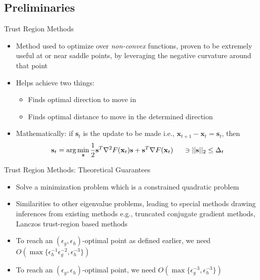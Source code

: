 \documentclass[10pt]{beamer}
\newcommand{\h}{\nabla^{2}}
\newcommand{\g}{\nabla}
\newcommand{\xbold}{\mathbf{x}}
\newcommand{\sbold}{\mathbf{s}}
\begin{document}
\subsection{Preliminaries}
\begin{frame}{Trust Region Methods}
\begin{itemize}
\item<1->{Method used to optimize over \emph{non-convex} functions, proven to be extremely useful at or near saddle points, by leveraging the negative curvature around that point}
\item<2->{Helps achieve two things:
  \begin{itemize}
    \item<3->Finds optimal direction to move in
    \item<4->Finds optimal distance to move in the determined direction
  \end{itemize}
  }
\item<5->{Mathematically: if \(\sbold_{t}\) is the update to be made i.e., \(\xbold_{t+1} - \xbold_{t} = \sbold_{t}\), then
\begin{equation}
\label{TR}
\sbold_{t} = \text{arg}\min_{\sbold} \frac{1}{2}\sbold^{T} \h F(\xbold_{t}) \sbold + \sbold^{T} \g F(\xbold_{t}) \hspace{5mm}\ni ||\sbold||_{2} \leq \Delta_{t}
\end{equation} %
}
\end{itemize}
\end{frame}

\begin{frame}{Trust Region Methods: Theoretical Guarantees}
\begin{itemize}
\item<1->{Solve a minimization problem which is a constrained quadratic problem}
\item<2->{Similarities to other eigenvalue problems, leading to special methods drawing inferences from existing methods e.g., truncated conjugate gradient methods, Lanczos trust-region based methods}
\item<3->{To reach an \((\epsilon_{g}, \epsilon_{h})\)-optimal point as defined earlier, we need \(O\left(\max\{\epsilon_{h}^{-1}\epsilon_{g}^{-2}, \epsilon_{h}^{-3}\}\right)\)} %
\item<4->{To reach an \((\epsilon_{g}, \epsilon_{h})\)-optimal point, we need \(O\left(\max\{\epsilon_{g}^{-3}, \epsilon_{h}^{-3}\}\right)\)} %
\end{itemize}
\end{frame}
\end{document}
